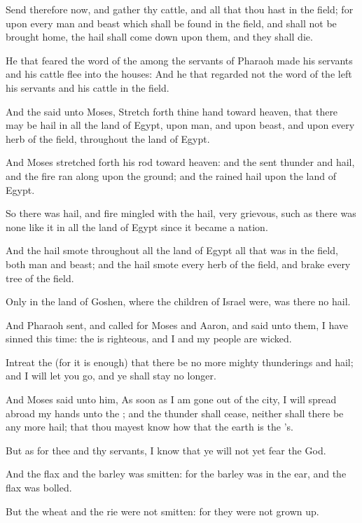 \verse Send therefore now, and gather thy cattle, and all that thou hast
in the field; for upon every man and beast which shall be found in the
field, and shall not be brought home, the hail shall come down upon
them, and they shall die.

\verse He that feared the word of the \LORD among the servants of Pharaoh
made his servants and his cattle flee into the houses: \verse And he
that regarded not the word of the \LORD left his servants and his
cattle in the field.

\verse And the \LORD said unto Moses, Stretch forth thine hand toward
heaven, that there may be hail in all the land of Egypt, upon man, and
upon beast, and upon every herb of the field, throughout the land of
Egypt.

\verse And Moses stretched forth his rod toward heaven: and the \LORD
sent thunder and hail, and the fire ran along upon the ground; and the
\LORD rained hail upon the land of Egypt.

\verse So there was hail, and fire mingled with the hail, very grievous,
such as there was none like it in all the land of Egypt since it
became a nation.

\verse And the hail smote throughout all the land of Egypt all that was
in the field, both man and beast; and the hail smote every herb of the
field, and brake every tree of the field.

\verse Only in the land of Goshen, where the children of Israel were,
was there no hail.

\verse And Pharaoh sent, and called for Moses and Aaron, and said unto
them, I have sinned this time: the \LORD is righteous, and I and my
people are wicked.

\verse Intreat the \LORD (for it is enough) that there be no more mighty
thunderings and hail; and I will let you go, and ye shall stay no
longer.

\verse And Moses said unto him, As soon as I am gone out of the city, I
will spread abroad my hands unto the \LORD; and the thunder shall
cease, neither shall there be any more hail; that thou mayest know how
that the earth is the \LORD's.

\verse But as for thee and thy servants, I know that ye will not yet
fear the \LORD God.

\verse And the flax and the barley was smitten: for the barley was in
the ear, and the flax was bolled.

\verse But the wheat and the rie were not smitten: for they were not
grown up.

